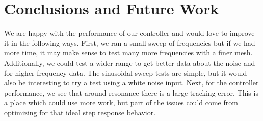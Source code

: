 \documentclass[11pt]{article}
\begin{document}
\section{Conclusions and Future Work}
We are happy with the performance of our controller and would love to improve it in the following ways. First, we ran a small sweep of frequencies but if we had more time, it may make sense to test many more frequencies with a finer mesh. Additionally, we could test a wider range to get better data about the noise and for higher frequency data. The sinusoidal sweep tests are simple, but it would also be interesting to try a test using a white noise input. 
Next, for the controller performance, we see that around resonance there is a large tracking error. This is a place which could use more work, but part of the issues could come from optimizing for that ideal step response behavior. 

\end{document}
